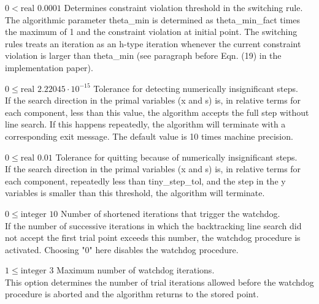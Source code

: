 %
{$0<\textrm{real}$}%
{$0.0001$}%
{Determines constraint violation threshold in the switching rule.\\
The algorithmic parameter theta\_min is determined as theta\_min\_fact times the maximum of 1 and the constraint violation at initial point.  The switching rules treats an iteration as an h-type iteration whenever the current constraint violation is larger than theta\_min (see paragraph before Eqn. (19) in the implementation paper).}%
{}

%
{$0\leq\textrm{real}$}%
{$2.22045 \cdot 10^{-15}$}%
{Tolerance for detecting numerically insignificant steps.\\
If the search direction in the primal variables (x and s) is, in relative terms for each component, less than this value, the algorithm accepts the full step without line search.  If this happens repeatedly, the algorithm will terminate with a corresponding exit message. The default value is 10 times machine precision.}%
{}

%
{$0\leq\textrm{real}$}%
{$0.01$}%
{Tolerance for quitting because of numerically insignificant steps.\\
If the search direction in the primal variables (x and s) is, in relative terms for each component, repeatedly less than tiny\_step\_tol, and the step in the y variables is smaller than this threshold, the algorithm will terminate.}%
{}

%
{$0\leq\textrm{integer}$}%
{$10$}%
{Number of shortened iterations that trigger the watchdog.\\
If the number of successive iterations in which the backtracking line search did not accept the first trial point exceeds this number, the watchdog procedure is activated.  Choosing "0" here disables the watchdog procedure.}%
{}

%
{$1\leq\textrm{integer}$}%
{$3$}%
{Maximum number of watchdog iterations.\\
This option determines the number of trial iterations allowed before the watchdog procedure is aborted and the algorithm returns to the stored point.}%
{}

